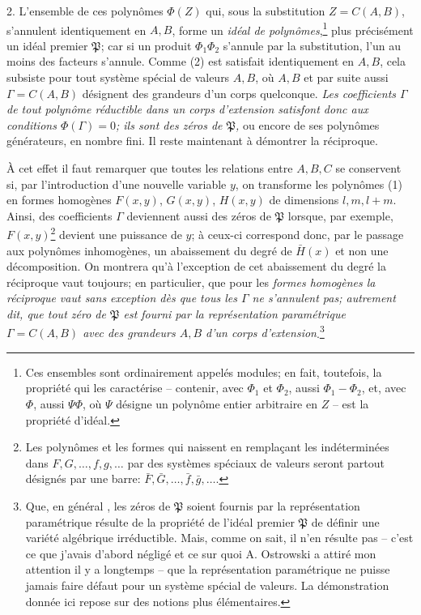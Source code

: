 \documentclass[11pt]{article}
\begin{document}
2. L'ensemble de ces polynômes $\Phi(Z)$ qui, sous la substitution $Z=C(A,B)$, s'annulent identiquement en $A,B$, forme un \emph{idéal de polynômes},\footnote{Ces ensembles sont ordinairement appelés modules; en fait, toutefois, la propriété qui les caractérise -- contenir, avec $\Phi_1$ et $\Phi_2$, aussi $\Phi_1-\Phi_2$, et, avec $\Phi$, aussi $\Psi\Phi$, où $\Psi$ désigne un polynôme entier arbitraire en $Z$ -- est la propriété d'idéal.} plus précisément un idéal premier $\mathfrak P$; car si un produit $\Phi_1\Phi_2$ s'annule par la substitution, l'un au moins des facteurs s'annule. Comme (2) est satisfait identiquement en $A,B$, cela subsiste pour tout système spécial de valeurs $A,B$, où $A,B$ et par suite aussi $\Gamma=C(A,B)$ désignent des grandeurs d'un corps quelconque. \emph{Les coefficients $\Gamma$ de tout polynôme réductible dans un corps d'extension satisfont donc aux conditions $\Phi(\Gamma)=0$; ils sont des zéros de $\mathfrak P$,} ou encore de ses polynômes générateurs, en nombre fini. Il reste maintenant à démontrer la réciproque.

À cet effet il faut remarquer que toutes les relations entre $A,B,C$ se conservent si, par l'introduction d'une nouvelle variable $y$, on transforme les polynômes (1) en formes homogènes $F(x,y)$, $G(x,y)$, $H(x,y)$ de dimensions $l,m,l+m$. Ainsi, des coefficients $\Gamma$ deviennent aussi des zéros de $\mathfrak P$ lorsque, par exemple, $F(x,y)$\footnote{Les polynômes et les formes qui naissent en remplaçant les indéterminées dans $F,G,\ldots,f,g,\ldots$ par des systèmes spéciaux de valeurs seront partout désignés par une barre: $\bar F,\bar G,\ldots,\bar f,\bar g,\ldots$.} devient une puissance de $y$; à ceux-ci correspond donc, par le passage aux polynômes inhomogènes, un abaissement du degré de $\bar H(x)$ et non une décomposition. On montrera qu'à l'exception de cet abaissement du degré la réciproque vaut toujours; en particulier, que pour les \emph{formes homogènes la réciproque vaut sans exception dès que tous les $\Gamma$ ne s'annulent pas; autrement dit, que tout zéro de $\mathfrak P$ est fourni par la représentation paramétrique $\Gamma=C(A,B)$ avec des grandeurs $A,B$ d'un corps d'extension}.\footnote{Que, \og en général \fg{}, les zéros de $\mathfrak P$ soient fournis par la représentation paramétrique résulte de la propriété de l'idéal premier $\mathfrak P$ de définir une variété algébrique irréductible. Mais, comme on sait, il n'en résulte pas -- c'est ce que j'avais d'abord négligé et ce sur quoi A. Ostrowski a attiré mon attention il y a longtemps -- que la représentation paramétrique ne puisse jamais faire défaut pour un système spécial de valeurs. La démonstration donnée ici repose sur des notions plus élémentaires.}
\end{document}
